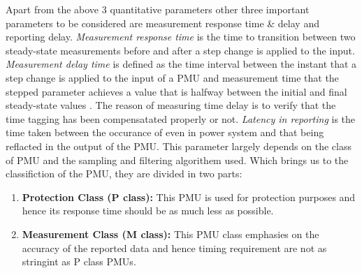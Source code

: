 Apart from the above 3 quantitative parameters other three important parameters to be considered are measurement response time \& delay and reporting delay. \textit{Measurement response time} is the time to transition between two steady-state measurements before and after a step change is applied to the input. \textit{Measurement delay time} is defined as the time interval between the instant that a step change is applied to the input of a PMU and measurement time that the stepped parameter achieves a value that is halfway between the initial and final steady-state values \cite{std:c37}. The reason of measuring time delay is to verify that the time tagging has been compensatated properly or not.  \textit{Latency in reporting} is the time taken between the occurance of even in power system and that being reflacted in the output of the PMU. This parameter largely depends on the class of PMU and the sampling and filtering algorithem used. Which brings us to the classifiction of the PMU, they are divided in two parts:
\begin{enumerate}
\item \textbf{Protection Class (P class):} This PMU is used for protection purposes and hence its response time should be as much less as possible.
\item \textbf{Measurement Class (M class):}  This PMU class emphasies on the accuracy of the reported data and hence timing requirement are not as stringint as P class PMUs.
\end{enumerate} 
